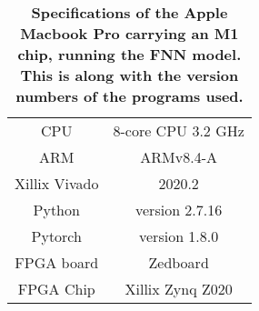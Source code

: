 \begin{table}
\centering
\begin{tabular}{c c } 
 \hline
CPU & 8-core CPU 3.2 GHz\\ 
ARM & ARMv8.4-A \\
Xillix Vivado & 2020.2 \\ 
Python & version 2.7.16 \\ 
Pytorch & version 1.8.0 \\
FPGA board & Zedboard \\
FPGA Chip & Xillix Zynq Z020 \\ [1ex] 
 \hline
\end{tabular}
\caption\textbf{Specifications of the Apple Macbook Pro carrying an M1 chip, running the FNN model. This is along with the version numbers of the programs used.}
\label{table:machine}
\end{table}



















